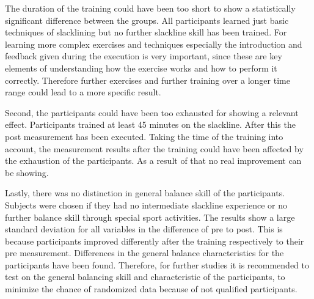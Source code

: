 The duration of the training could have been too short to show a statistically significant difference between the groups.
All participants learned just basic techniques of slacklining but no further slackline skill has been trained.
For learning more complex exercises and techniques especially the introduction and feedback given during the execution is very important, since these are key elements of understanding how the exercise works and how to perform it correctly.
Therefore further exercises and further training over a longer time range  could lead to a more specific result.

Second, the participants could have been too exhausted for showing a relevant effect.
Participants trained at least 45 minutes on the slackline.
After this the post measurement has been executed.
Taking the time of the training into account, the measurement results after the training could have been affected by the exhaustion of the participants. 
As a result of that no real improvement can be showing.



Lastly, there was no distinction in general balance skill of the participants.
Subjects were chosen if they had no intermediate slackline experience or no further balance skill through special sport activities.
The results show a large standard deviation for all variables in the difference of pre to post.
This is because participants improved differently after the training respectively to their pre measurement.
Differences in the general balance characteristics for the participants have been found.
Therefore, for further studies it is recommended to test on the general balancing skill and characteristic of the participants, to minimize the chance of randomized data because of not qualified participants.


